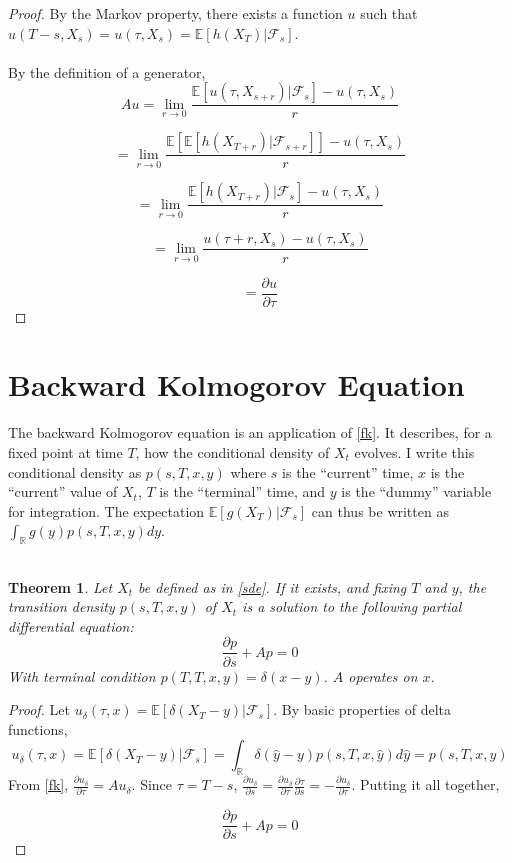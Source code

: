 \documentclass{article}
\newtheorem{theorem}{Theorem}
\theoremstyle{definition}
\begin{document}
\begin{proof}
	By the Markov property, there exists a function \(u\) such that \(u(T-s, X_s)=u(\tau, X_s)=\mathbb{E}[h(X_T)|\mathcal{F}_s]\). 
	\\
	\\
	By the definition of a generator,
	\[Au=\lim_{r \to 0} \frac{\mathbb{E}\left[ u(\tau, X_{s+r}) | \mathcal{F}_s \right] - u(\tau, X_s)}{r} \]
	
	\[ =  \lim_{r \to 0} \frac{\mathbb{E}\left[ \mathbb{E}\left[ h(X_{T+r}) | \mathcal{F}_{s+r} \right] \right] - u(\tau, X_s)}{r} \]
	
	\[ =  \lim_{r \to 0} \frac{ \mathbb{E}\left[ h(X_{T+r}) | \mathcal{F}_s \right] - u(\tau, X_s)}{r} \]
	
	\[ =  \lim_{r \to 0} \frac{ u(\tau+r, X_s) - u(\tau, X_s)}{r} \]
	
	\[= \frac{\partial u}{\partial \tau}\]
	

\end{proof}


\section{Backward Kolmogorov Equation}

The backward Kolmogorov equation is an application of \ref{fk}.  It describes, for a fixed point at time \(T\), how the conditional density of \(X_t\) evolves.  I write this conditional density as \(p(s, T, x, y)\) where \(s\) is the ``current'' time, \(x\) is the ``current'' value of \(X_t\), \(T\) is the ``terminal'' time, and \(y\) is the ``dummy'' variable for integration.  The expectation \(\mathbb{E}[g(X_T)|\mathcal{F}_s]\) can thus be written as \(\int_\mathbb{R} g(y) p(s, T, x, y) dy \).   
\\
\\
\begin{theorem}\label{bk}
	Let \(X_t\) be defined as in \ref{sde}. If it exists, and fixing \(T\) and \(y\), the transition density \(p(s, T, x, y)\) of \(X_t\) is a solution to the following partial differential equation:
	\[\frac{\partial p}{\partial s} + Ap=0 \]
	With terminal condition \(p(T, T, x, y)=\delta(x-y)\).  \(A\) operates on \(x\).
\end{theorem}

\begin{proof}
	Let \(u_\delta (\tau, x)= \mathbb{E}\left[\delta(X_T-y)  | \mathcal{F}_s\right]\).
	By basic properties of delta functions, 
	\[u_\delta(\tau, x)=\mathbb{E}\left[\delta(X_T-y) | \mathcal{F}_s \right]=\int_\mathbb{R} \delta(\hat{y}-y) p(s, T, x, \hat{y}) d\hat{y}=p(s, T, x, y)\]
	From \ref{fk}, \(\frac{\partial u_\delta}{\partial \tau}=Au_\delta\).  Since \(\tau=T-s\), \(\frac{\partial u_\delta}{\partial s} = \frac{\partial u_\delta}{\partial \tau} \frac{\partial \tau}{\partial s}=-\frac{\partial u_\delta}{\partial \tau} \).  Putting it all together, 
	
	\[\frac{\partial p}{\partial s} + Ap=0 \]
	
\end{proof}
\end{document}
